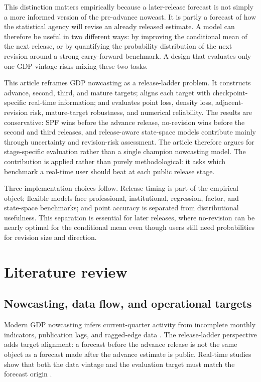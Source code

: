 \documentclass[12pt]{article}
\begin{document}
This distinction matters empirically because a later-release forecast is not simply a more informed version of the pre-advance nowcast. It is partly a forecast of how the statistical agency will revise an already released estimate. A model can therefore be useful in two different ways: by improving the conditional mean of the next release, or by quantifying the probability distribution of the next revision around a strong carry-forward benchmark. A design that evaluates only one GDP vintage risks mixing these two tasks.

This article reframes GDP nowcasting as a release-ladder problem. It constructs advance, second, third, and mature targets; aligns each target with checkpoint-specific real-time information; and evaluates point loss, density loss, adjacent-revision risk, mature-target robustness, and numerical reliability. The results are conservative: SPF wins before the advance release, no-revision wins before the second and third releases, and release-aware state-space models contribute mainly through uncertainty and revision-risk assessment. The article therefore argues for stage-specific evaluation rather than a single champion nowcasting model. The contribution is applied rather than purely methodological: it asks which benchmark a real-time user should beat at each public release stage.

Three implementation choices follow. Release timing is part of the empirical object; flexible models face professional, institutional, regression, factor, and state-space benchmarks; and point accuracy is separated from distributional usefulness. This separation is essential for later releases, where no-revision can be nearly optimal for the conditional mean even though users still need probabilities for revision size and direction.


\section{Literature review}
\label{sec:literature}

\subsection{Nowcasting, data flow, and operational targets}

Modern GDP nowcasting infers current-quarter activity from incomplete monthly indicators, publication lags, and ragged-edge data \citep{giannone2008,banbura2013,bok2018}. The release-ladder perspective adds target alignment: a forecast before the advance release is not the same object as a forecast made after the advance estimate is public. Real-time studies show that both the data vintage and the evaluation target must match the forecast origin \citep{croushorestark2003,croushore2011}.
\end{document}
